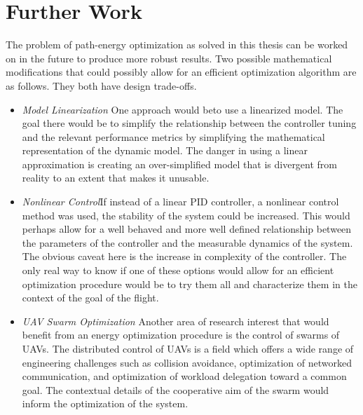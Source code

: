 \section{Further Work}

The problem of path-energy optimization as solved in this thesis can be worked on in the future to produce more robust results. Two possible mathematical modifications that could possibly allow for an efficient optimization algorithm are as follows. They both have design trade-offs.

\begin{itemize}

\item \textit{Model Linearization} One approach would beto use a linearized model. The goal there would be to simplify the relationship between the controller tuning and the relevant performance metrics by simplifying the mathematical representation of the dynamic model. The danger in using a linear approximation is creating an over-simplified model that is divergent from reality to an extent that makes it unusable.

\item \textit{Nonlinear Control}If instead of a linear PID controller, a nonlinear control method was used, the stability of the system could be increased. This would perhaps allow for a well behaved and more well defined relationship between the parameters of the controller and the measurable dynamics of the system. The obvious caveat  here is the increase in complexity of the controller. The only real way to know if one of these options would allow for an efficient optimization procedure would be to try them all and characterize them in the context of the goal of the flight.

\item \textit{UAV Swarm Optimization} Another area of research interest that would benefit from an energy optimization procedure is the control of swarms of UAVs. The distributed control of UAVs is a field which offers a wide range of engineering challenges such as collision avoidance, optimization of networked communication, and optimization of workload delegation toward a common goal. The contextual details of the cooperative aim of the swarm would inform the optimization of the system.



\end{itemize}
